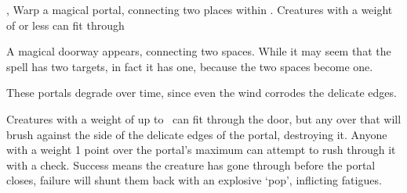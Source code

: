   {\mEarth,\mFire}%
  {Warp}%
  {\duplicated}%
  {}%
  {a magical portal, connecting two places within \spellRange. Creatures with a \gls{weight} of  or less can fit through}%
  {
    A magical doorway appears, connecting two spaces.
    While it may seem that the spell has two targets, in fact it has one, because the two spaces become one.

    These portals degrade over time, since even the wind corrodes the delicate edges.

    Creatures with a \gls{weight} of up to \spellArea\ can fit through the door, but any over that will brush against the side of the delicate edges of the portal, destroying it.
    Anyone with a \gls{weight} 1 point over the portal's maximum can attempt to rush through it with a  check.
    Success means the creature has gone through before the portal closes, failure will shunt them back with an explosive `pop', inflicting  \glspl{fatigue}.
  }

